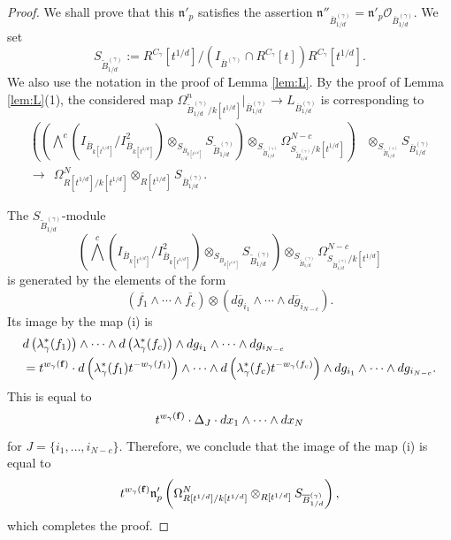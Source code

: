 \documentclass[10pt,a4paper]{amsart}
\begin{document}
\begin{proof}
We shall prove that this $\mathfrak{n}'_{p}$ satisfies the assertion $\mathfrak{n}''_{\overline{B}^{(\gamma)}_{1/d}} = \mathfrak{n}'_{p} \mathcal{O}_{\overline{B}^{(\gamma)}_{1/d}}$.  
We set 
\[
S_{\widetilde{B}^{(\gamma)}_{1/d}} := R^{C_{\gamma}}[t^{1/d}] \big/ \left(  I_{\overline{B}^{(\gamma)}} \cap R^{C_{\gamma}}[t] \right) R^{C_{\gamma}}[t^{1/d}]. 
\]
We also use the notation in the proof of Lemma \ref{lem:L}. 
By the proof of Lemma \ref{lem:L}(1), the considered map $\Omega^n _{\widetilde{B}^{(\gamma)}_{1/d}/k[t^{1/d}]} \big|_{\overline{B}^{(\gamma)}_{1/d}} \to L_{\overline{B}^{(\gamma)}_{1/d}}$ is corresponding to 
\begin{align*}
\tag{i}
\left ( \left( \bigwedge ^{c} \left( I_{\overline{B}_{k[t^{1/d}]}}/ I^2_{\overline{B}_{k[t^{1/d}]}} \right) \otimes _{S_{\overline{B}_{k[t^{1/d}]}}} S_{\widetilde{B}^{(\gamma)}_{1/d}} \right)  \otimes _{S_{\widetilde{B}^{(\gamma)}_{1/d}}} \Omega _{S_{\widetilde{B}^{(\gamma)}_{1/d}}/k[t^{1/d}]} ^{N-c} \right) &
\otimes _{S_{\widetilde{B}^{(\gamma)}_{1/d}}} S_{\overline{B}^{(\gamma)}_{1/d}} \\
\longrightarrow \ \ \Omega _{R[t^{1/d}]/k[t^{1/d}]} ^N \otimes _{R[t^{1/d}]} S_{\overline{B}^{(\gamma)}_{1/d}}. & 
\end{align*}

The
$S_{\widetilde{B}^{(\gamma)}_{1/d}}$-module 
\[
\left( \bigwedge ^{c} \left( I_{\overline{B}_{k[t^{1/d}]}}/ I^2_{\overline{B}_{k[t^{1/d}]}} \right) \otimes _{S_{\overline{B}_{k[t^{1/d}]}}} S_{\widetilde{B}^{(\gamma)}_{1/d}} \right) \otimes _{S_{\widetilde{B}^{(\gamma)}_{1/d}}} \Omega _{S_{\widetilde{B}^{(\gamma)}_{1/d}}/k[t^{1/d}]} ^{N-c}
\] is generated by the elements of the form 
\[
\left( \overline{f_1} \wedge \cdots \wedge \overline{f_c} \right) \otimes \left( d \overline{g}_{i_1} \wedge \cdots \wedge d \overline{g}_{i_{N-c}} \right).  
\]
Its image by the map (i) is
\begin{align*}
&d \left( \lambda _{\gamma} ^* (f_1) \right) \wedge \cdots \wedge d \left( \lambda _{\gamma} ^* (f_c) \right) \wedge  dg_{i _1} \wedge \cdots \wedge dg_{i_{N-c}} \\
&=t^{w_{\gamma}({\bf f})} \cdot d \left( \lambda _{\gamma} ^* (f_1) t^{- w_{\gamma} (f_1)} \right) \wedge \cdots \wedge d \left( \lambda _{\gamma} ^* (f_c) t^{- w_{\gamma} (f_c)} \right) \wedge  d g_{i _1} \wedge \cdots \wedge d g_{i_{N-c}}. 
\end{align*}
This is equal to 
\[
t^{w_{\gamma}({\bf f})} \cdot \Delta _J \cdot dx_1 \wedge \cdots \wedge dx_N
\]
for $J = \{ i_1, \ldots , i_{N-c} \}$. 
Therefore, we conclude that the image of the map (i) is equal to 
\[
t^{w_\gamma({\bf f})} \mathfrak{n}'_{p} \left( \Omega _{R[t^{1/d}]/k[t^{1/d}]} ^N \otimes _{R[t^{1/d}]} S_{\overline{B}^{(\gamma)}_{1/d}} \right), 
\]
which completes the proof. 
\end{proof}
\end{document}
